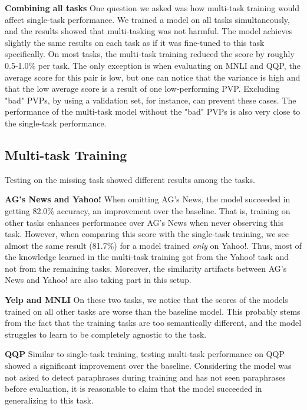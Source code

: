 \documentclass[11pt,a4paper]{article}
\newcommand{\subtitle}[1]{\vspace{5pt}\noindent\textbf{#1}\quad}
\begin{document}
\subtitle{Combining all tasks}
One question we asked was how multi-task training would affect single-task performance.
We trained a model on all tasks simultaneously, and the results showed that multi-tasking was not harmful.
The model achieves slightly the same results on each task as if it was fine-tuned to this task specifically.
On most tasks, the multi-task training reduced the score by roughly 0.5-1.0\% per task.
The only exception is when evaluating on MNLI and QQP, the average score for this pair is low, but one can notice that the variance is high and that the low average score is a result of one low-performing PVP.
Excluding "bad" PVPs, by using a validation set, for instance, can prevent these cases.
The performance of the multi-task model without the "bad" PVPs is also very close to the single-task performance.


\subsection{Multi-task Training}
Testing on the missing task showed different results among the tasks.
 
\subtitle{AG's News and Yahoo!}
When omitting AG's News, the model succeeded in getting 82.0\% accuracy, an improvement over the baseline.
That is, training on other tasks enhances performance over AG's News when never observing this task.
However, when comparing this score with the single-task training, we see almost the same result (81.7\%) for a model trained \textit{only} on Yahoo!.
Thus, most of the knowledge learned in the multi-task training got from the Yahoo! task and not from the remaining tasks.
Moreover, the similarity artifacts between AG's News and Yahoo! are also taking part in this setup.

\subtitle{Yelp and MNLI}
On these two tasks, we notice that the scores of the models trained on all other tasks are worse than the baseline model.
This probably stems from the fact that the training tasks are too semantically different, and the model struggles to learn to be completely agnostic to the task.


\subtitle{QQP}
Similar to single-task training, testing multi-task performance on QQP showed a significant improvement over the baseline.
Considering the model was not asked to detect paraphrases during training and has not seen paraphrases before evaluation, it is reasonable to claim that the model succeeded in generalizing to this task.\\
\end{document}
